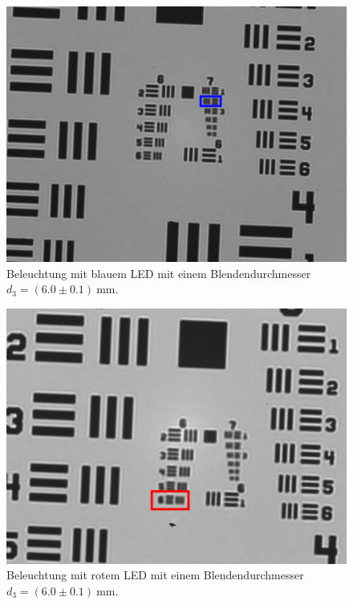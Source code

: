\documentclass{article}
\begin{document}
\begin{minipage}[t]{.45\textwidth}
\begin{figure}[H]
\includegraphics[scale=0.5]{tm/Bild_blau_grosse Lochblende.jpg}
\caption{Beleuchtung mit blauem LED mit einem Blendendurchmesser $d_3=(6.0\pm0.1)~$mm.}
\label{fig:bbild_6_blau_tm}
\end{figure}
\end{minipage}
\hfill
\noindent
\begin{minipage}[t]{.45\textwidth}
\begin{figure}[H]
\includegraphics[scale=0.5]{tm/Bild_rot_grosse Lochblende.jpg}
\caption{Beleuchtung mit rotem LED mit einem Blendendurchmesser $d_3=(6.0\pm0.1)~$mm.}
\label{fig:bbild_6_rot_tm}
\end{figure}
\end{minipage}
\end{document}
